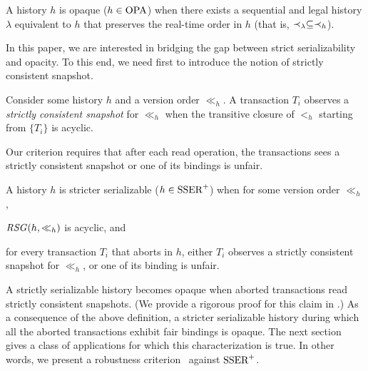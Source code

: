 \begin{definition}
  A history $h$ is opaque ($h \in \OPA$) when there exists a sequential and legal history $\lambda$ equivalent to $h$ that preserves the real-time order in $h$ (that is, $\hb_{\lambda} \subseteq \hb_{h}$).
\end{definition}

In this paper, we are interested in bridging the gap between strict serializability and opacity.
To this end, we need first to introduce the notion of strictly consistent snapshot. 

\begin{definition}
  Consider some history $h$ and a version order $\ll_h$.
  A transaction $T_i$ observes a \emph{strictly consistent snapshot} for $\ll_h$ when the transitive closure of $<_h$ starting from $\{T_i\}$ is acyclic.
\end{definition}

Our \SPSER criterion requires that after each read operation, the transactions sees a strictly consistent snapshot or one of its bindings is unfair.

\begin{definition}
  A history $h$ is stricter serializable ($h \in \SPSER$) when for some version order $\ll_h$,
  \begin{inparaenum}
  \item $\RSG(h,\ll_h)$ is acyclic, and
  \item for every transaction $T_i$ that aborts in $h$, either $T_i$ observes a strictly consistent snapshot for $\ll_h$, or one of its binding is unfair.
  \end{inparaenum}
\end{definition}

A strictly serializable history becomes opaque when aborted transactions read strictly consistent snapshots.
(We provide a rigorous proof for this claim in .)
As a consequence of the above definition, a stricter serializable history during which all the aborted transactions exhibit fair bindings is opaque.
The next section gives a class of applications for which this characterization is true.
In other words, we present a robustness criterion~\cite{CeroneG16} against $\SPSER$.

